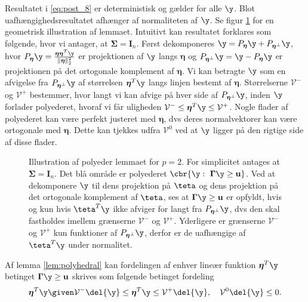 %
Resultatet i \eqref{eq:post_8} er deterministisk og gælder for alle \(\y\).
Blot uafhængighedsresultatet afhænger af normaliteten af \(\y\).
Se figur \ref{fig:polyhedron} for en geometrisk illustration af lemmaet.
Intuitivt kan resultatet forklares som følgende, hvor vi antager, at \(\boldsymbol{\Sigma}= \mathbf{I}_n\).
Først dekomponeres \(\y=P_{\boldsymbol{\eta}} \y + P_{\boldsymbol{\eta}^\perp} \y\), hvor \(P_{\boldsymbol{\eta}} \y = \frac{\boldsymbol{\eta} \boldsymbol{\eta}^T \y}{\Vert \boldsymbol{\eta} \Vert_2^2}\) er projektionen af \(\y\) langs \(\boldsymbol{\eta}\) og \(P_{\boldsymbol{\eta}^\perp} \y = \y - P_{\boldsymbol{\eta}} \y\) er projektionen på det ortogonale komplement af \(\boldsymbol{\eta}\).
Vi kan betragte \(\y\) som en afvigelse fra \(P_{\boldsymbol{\eta}^\perp} \y\) af størrelsen \(\boldsymbol{\eta}^T \y\) langs linjen bestemt af \(\boldsymbol{\eta}\).
Størrelserne \(\mathcal{V}^-\) og \(\mathcal{V}^+\) bestemmer, hvor langt vi kan afvige på hver side af \(P_{\boldsymbol{\eta}^\perp} \y\), inden \(\y\) forlader polyederet, hvoraf vi får uligheden \(\mathcal{V}^- \leq \boldsymbol{\eta}^T \y \leq \mathcal{V}^+\).
Nogle flader af polyederet kan være perfekt justeret med \(\boldsymbol{\eta}\), dvs deres normalvektorer kan være ortogonale med \(\boldsymbol{\eta}\).
Dette kan tjekkes udfra \(\mathcal{V}^0\) ved at \(\y\) ligger på den rigtige side af disse flader.  
%
\begin{figure}[H]
\centering
\scalebox{1}{}
\caption{Illustration af polyeder lemmaet for \(p=2\). For simplicitet antages at \(\boldsymbol{\Sigma} = \mathbf{I}_n\). Det blå område er polyederet \(\cbr{\y : \ \boldsymbol{\Gamma} \y \geq \mathbf{u}}\).
Ved at dekomponere \(\y\) til dens projektion på \(\teta\) og dens projektion på det ortogonale komplement af \(\teta\), ses at \(\boldsymbol{\Gamma} \y \geq \mathbf{u}\) er opfyldt, hvis og kun hvis \(\teta^T \y\) ikke afviger for langt fra \(P_{\boldsymbol{\eta}^\perp} \y\), dvs den skal fastholdes imellem grænserne \(\mathcal{V}^-\) og \(\mathcal{V}^+\).
Yderligere er grænserne \(\mathcal{V}^-\) og \(\mathcal{V}^+\) kun funktioner af \(P_{\boldsymbol{\eta}^\perp} \y\), derfor er de uafhængige af \(\teta^T \y\) under normalitet.} \label{fig:polyhedron}
\end{figure}
%
Af lemma \ref{lem:polyhedral} kan fordelingen af enhver lineær funktion \(\boldsymbol{\eta}^T \y\) betinget \(\boldsymbol{\Gamma} \y \geq \mathbf{u}\) skrives som følgende betinget fordeling
\begin{align*}
\boldsymbol{\eta}^T \y \given \mathcal{V}^- \del{\y} \leq \boldsymbol{\eta}^T \y \leq \mathcal{V}^+ \del{\y}, \quad \mathcal{V}^0 \del{\y} \leq 0.
\end{align*}
